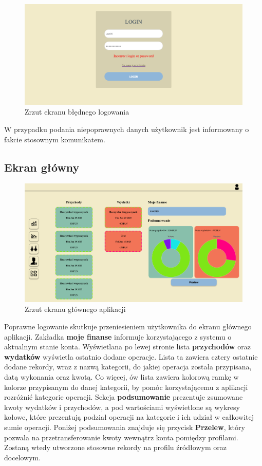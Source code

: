 \documentclass[12pt,a4paper,oneside]{article}
\begin{document}
\begin{figure}[H]
    \centering
    \includegraphics[width=\hsize,keepaspectratio]{images/login_failed.png}
    \caption{Zrzut ekranu błędnego logowania}
\end{figure}
W przypadku podania niepoprawnych danych użytkownik jest informowany o fakcie
stosownym komunikatem.

\subsection{Ekran główny}
\begin{figure}[H]
    \centering
    \includegraphics[width=\hsize,keepaspectratio]{images/profile.png}
    \caption{Zrzut ekranu głównego aplikacji}
\end{figure}
Poprawne logowanie skutkuje przeniesieniem użytkownika do ekranu głównego 
aplikacji. Zakładka \textbf{moje finanse} informuje korzystającego z systemu o
aktualnym stanie konta. Wyświetlana po lewej stronie lista \textbf{przychodów} 
oraz \textbf{wydatków} wyświetla ostatnio dodane operacje. Lista ta zawiera 
cztery ostatnie dodane rekordy, wraz z nazwą kategorii, do jakiej operacja 
została przypisana, datą wykonania oraz kwotą. Co więcej, ów lista zawiera 
kolorową ramkę w kolorze przypisanym do danej kategorii, by pomóc korzystającemu
z aplikacji rozróżnić kategorie operacji. Sekcja \textbf{podsumowanie}
prezentuje zsumowane kwoty wydatków i przychodów, a pod wartościami wyświetlone
są wykresy kołowe, które prezentują podział operacji na kategorie i ich udział w
całkowitej sumie operacji. Poniżej podsumowania znajduje się przycisk
\textbf{Przelew}, który pozwala na przetransferowanie kwoty wewnątrz konta
pomiędzy profilami. Zostaną wtedy utworzone stosowne rekordy na profilu źródłowym
oraz docelowym.
\end{document}
